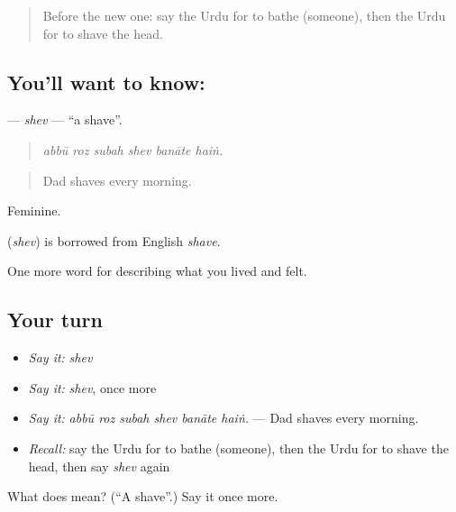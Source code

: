 \label{lesson:UR-C482-shev}



\begin{quote}
Before the new one: say the Urdu for to bathe (someone), then the Urdu for to shave the head.
\end{quote}

\subsection*{You'll want to know: }
\textbf{} — \emph{shev} — \textquotedblleft{}a shave\textquotedblright{}.

\begin{quote}
     
\end{quote}

\begin{quote}
\emph{abbū roz subah shev banāte haiṅ.}
\end{quote}

\begin{quote}
Dad shaves every morning.
\end{quote}

Feminine.

\begin{cousinweb}
\textbf{} (\emph{shev}) is borrowed from English \emph{shave}.
\end{cousinweb}

\begin{grammarlens}[title={What you've built}]
One more word for describing what you lived and felt.
\end{grammarlens}

\subsection*{Your turn}
\begin{itemize}
\raggedright
  \item \emph{Say it:} \emph{shev}
  \item \emph{Say it:} \emph{shev}, once more
  \item \emph{Say it:} \emph{abbū roz subah shev banāte haiṅ.} — Dad shaves every morning.
  \item \emph{Recall:} say the Urdu for to bathe (someone), then the Urdu for to shave the head, then say \emph{shev} again
\end{itemize}

\begin{tcolorbox}[breakable,colback=teal!4,colframe=teal!35!black,title={Before you move on}]
What does  mean? (\textquotedblleft{}A shave\textquotedblright{}.) Say it once more.
\end{tcolorbox}
